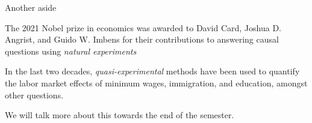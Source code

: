 \documentclass{./../div_teaching_slides}
\begin{document}
\begin{frame}{Another aside}
\begin{witemize}
  \item The 2021 Nobel prize in economics was awarded to David Card, Joshua D. Angrist, and Guido W. Imbens for their contributions to answering causal questions using \textit{natural experiments}
  \item In the last two decades, \textit{quasi-experimental} methods have been used to quantify the labor market effects of minimum wages, immigration, and education, amongst other questions. 
  \item We will talk more about this towards the end of the semester.
\end{witemize}
\end{frame}

%
%
\end{document}
